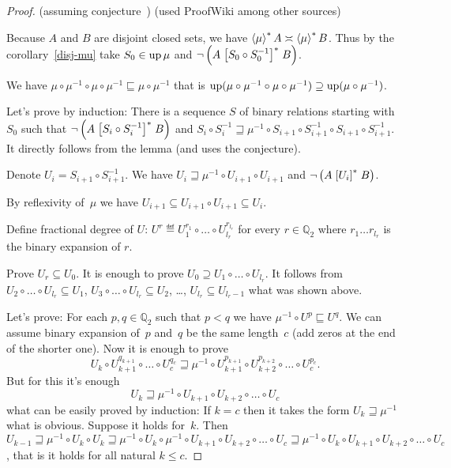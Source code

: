 \begin{proof}
(assuming conjecture~) (used ProofWiki among other sources)

Because $A$ and $B$ are disjoint closed sets, we
have $\left\langle \mu\right\rangle ^{\ast} A \asymp \left\langle \mu\right\rangle ^{\ast} B$. Thus by the corollary~\ref{disj-mu} take $S_0 \in \operatorname{up}
\mu$ and $\neg \left( A \mathrel{\left[S_0 \circ S_0^{- 1}\right]^{\ast}} B
\right)$.

We have $\mu \circ \mu^{- 1} \circ \mu \circ \mu^{- 1}
\sqsubseteq \mu \circ \mu^{- 1}$ that is $\operatorname{up} (\mu
\circ \mu^{- 1} \circ \mu \circ \mu^{- 1}) \supseteq
\operatorname{up} (\mu \circ \mu^{- 1})$.

Let's prove by induction: There is a sequence $S$ of binary relations starting
with $S_0$ such that $\neg \left( A \mathrel{\left[S_i \circ S_i^{- 1}\right]^{\ast}} B
\right)$ and $S_i \circ S_i^{- 1} \sqsupseteq \mu^{-1} \circ S_{i + 1} \circ S_{i + 1}^{- 1}
\circ S_{i + 1} \circ S_{i + 1}^{- 1}$. It directly follows from the lemma
(and uses the conjecture).

Denote $U_i = S_{i + 1} \circ S_{i + 1}^{- 1}$. We have $U_i \sqsupseteq \mu^{-1} \circ U_{i +
1} \circ U_{i + 1}$ and $\neg \left( A \mathrel{\left[U_i\right]^{\ast}} B \right)$.

By reflexivity of~$\mu$ we have $U_{i+1} \subseteq U_{i+1}\circ U_{i+1} \subseteq U_i$.

Define fractional degree of $U$: $U^r \eqdef U_1^{r_1} \circ
\ldots \circ U_{l_r}^{r_{l_r}}$ for every $r \in \mathbb{Q}_2$ where $r_1
\ldots r_{l_r}$ is the binary expansion of $r$.

Prove $U_r\subseteq U_0$. It is enough to prove
$U_0 \supseteq U_1 \circ \ldots \circ U_{l_r}$. It follows from $U_2 \circ
\ldots \circ U_{l_r} \subseteq U_1$, $U_3 \circ \ldots \circ U_{l_r} \subseteq
U_2$, \dots, $U_{l_r} \subseteq U_{l_r - 1}$ what was shown above.

Let's prove: For each $p,q\in\mathbb{Q}_2$ such that $p<q$ we have $\mu^{-1}\circ U^p\sqsubseteq U^q$.
We can assume binary expansion of~$p$ and~$q$ be the same length~$c$ (add zeros at the end of the shorter one).
Now it is enough to prove
\[ U_k\circ U_{k+1}^{q_{k+1}}\circ\dots\circ U_c^{q_c}\sqsupseteq\mu^{-1}\circ U_{k+1}^{p_{k+1}}\circ U_{k+2}^{p_{k+2}}\circ\dots\circ U_c^{p_c}. \]
But for this it's enough
\[ U_k\sqsupseteq\mu^{-1}\circ U_{k+1}\circ U_{k+2}\circ\dots\circ U_c \]
what can be easily proved by induction:
If $k=c$ then it takes the form $U_k\sqsupseteq\mu^{-1}$
what is obvious.
Suppose it holds for~$k$. Then $U_{k-1}\sqsupseteq\mu^{-1}\circ U_k\circ U_k\sqsupseteq
\mu^{-1}\circ U_k\circ \mu^{-1}\circ U_{k+1}\circ U_{k+2}\circ\dots\circ U_c\sqsupseteq
\mu^{-1}\circ U_k\circ U_{k+1}\circ U_{k+2}\circ\dots\circ U_c$, that is it holds
for all natural $k\leq c$.


\end{proof}
